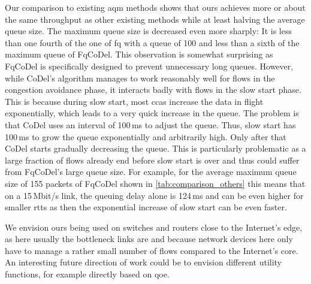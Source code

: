 \documentclass[conference]{IEEEtran}
\begin{document}
Our comparison to existing \gls{aqm} methods shows that \gls{ours} achieves more or about the same throughput as other existing methods while at least halving the average queue size. The maximum queue size is decreased even more sharply: It is less than one fourth of the one of fq with a queue of 100 and less than a sixth of the maximum queue of FqCoDel. This observation is somewhat surprising as FqCoDel is specifically designed to prevent unnecessary long queues. However, while CoDel's algorithm manages to work reasonably well for flows in the congestion avoidance phase, it interacts badly with flows in the slow start phase. This is because during slow start, most \glspl{cca} increase the data in flight exponentially, which leads to a very quick increase in the queue. The problem is that CoDel uses an interval of 100\,ms to adjust the queue. Thus, slow start has 100\,ms to grow the queue exponentially and arbitrarily high. Only after that CoDel starts gradually decreasing the queue. This is particularly problematic as a large fraction of flows already end before slow start is over \cite{jurkiewicz_flow_2020} and thus could suffer from FqCoDel's large queue size. For example, for the average maximum queue size of 155 packets of FqCoDel shown in \autoref{tab:comparison_others} this means that on a 15\,Mbit/s link, the queuing delay alone is 124\,ms and can be even higher for smaller \glspl{rtt} as then the exponential increase of slow start can be even faster. 


We envision \gls{ours} being used on switches and routers close to the Internet's edge, as here usually the bottleneck links are and because network devices here only have to manage a rather small number of flows compared to the Internet's core. An interesting future direction of work could be to envision different utility functions, for example directly based on \gls{qoe}. 



\end{document}
